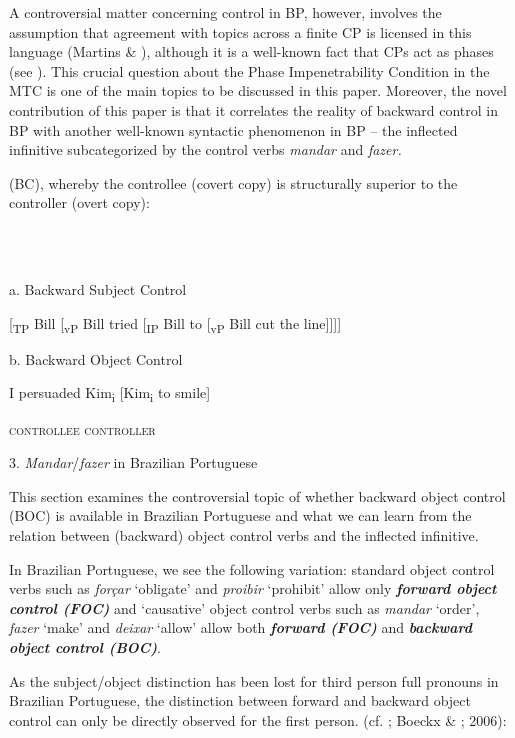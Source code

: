 \documentclass[output=paper]{langsci/langscibook}
\begin{document}
  A controversial matter concerning control in BP, however, involves the assumption that agreement with topics across a finite CP is licensed in this language (Martins \& \citealt{Nunes2010}), although it is a well-known fact that CPs act as phases (see \citealt{Chomsky2000}). This crucial question about the Phase Impenetrability Condition in the MTC is one of the main topics to be discussed in this paper. Moreover, the novel contribution of this paper is that it correlates the reality of backward control in BP with another well-known syntactic phenomenon in BP – the inflected infinitive subcategorized by the control verbs \textit{mandar} and \textit{fazer.}

 (BC), whereby the controllee (covert copy) is structurally superior to the controller (overt copy):

\ea%
    \label{ex:key:3}
    \gll\\
        \\
    \glt
    \z

          a.  Backward Subject Control

[\textsubscript{TP} Bill [\textsubscript{vP} Bill tried [\textsubscript{IP} Bill to [\textsubscript{vP} Bill cut the line]]]]    

  b.  Backward Object Control 

I persuaded  Kim\textsubscript{i}    [Kim\textsubscript{i}    to smile]      

        \textsc{controllee  controller}

3. \textit{Mandar}/\textit{fazer} in Brazilian Portuguese

This section examines the controversial topic of whether backward object control (BOC) is available in Brazilian Portuguese and what we can learn from the relation between (backward) object control verbs and the inflected infinitive.

In Brazilian Portuguese, we see the following variation: standard object control verbs such as \textit{forçar} ‘obligate’ and \textit{proibir} ‘prohibit’ allow only \textbf{\textit{forw}}\textbf{\textit{ard object control (FOC)}}  and ‘causative’ object control verbs such as \textit{mandar} ‘order’, \textit{fazer} ‘make’ and \textit{deixar} ‘allow’ allow both \textbf{\textit{forward (FOC)}} and \textbf{\textit{backward object control (BOC)}}.  

As the subject/object distinction has been lost for third person full pronouns in Brazilian Portuguese, the distinction between forward and backward object control can only be directly observed for the first person. (cf. \citealt{Farrell1995}; Boeckx \& \citealt{Hornstein2004}; 2006):
\end{document}
